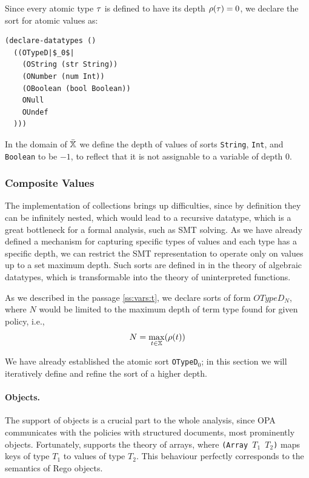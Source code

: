 Since every atomic type $\tau$ is defined to have its depth $\rho(\tau) = 0$, we declare the sort for atomic values as:
\begin{lstlisting}[language=SMT,escapechar=|]
(declare-datatypes ()
  ((OTypeD|$_0$|
    (OString (str String))
    (ONumber (num Int))
    (OBoolean (bool Boolean))
    ONull
    OUndef
  )))
\end{lstlisting}

In the domain of $\bar{\mathbb{X}}$ we define the depth of values of sorts \texttt{String}, \texttt{Int}, and \texttt{Boolean} to be $-1$, to reflect that it is not assignable to a variable of depth $0$.

\subsubsection{Composite Values}

The implementation of collections brings up difficulties, since by definition they can be infinitely nested, which would lead to a recursive datatype, which is a great bottleneck for a formal analysis, such as SMT solving.
As we have already defined a mechanism for capturing specific types of values and each type has a specific depth, we can restrict the SMT representation to operate only on values up to a set maximum depth.
Such sorts are defined in \smtlib in the theory of algebraic datatypes, which is transformable into the theory of uninterpreted functions.

As we described in the passage \ref{ss:vars:t}, we declare sorts of form \texttt{$OTypeD_N$}, where $N$ would be limited to the maximum depth of term type found for given policy, i.e.,
$$ N = \max_{t \in \mathbb{X}}(\rho(t)) $$

We have already established the atomic sort \texttt{OTypeD$_0$}; in this section we will iteratively define and refine the sort of a higher depth.

\paragraph{Objects.}
The support of objects is a crucial part to the whole analysis, since OPA communicates with the policies with structured documents, most prominently objects.
Fortunately, \smtlib supports the theory of arrays, where \texttt{(Array $T_1$ $T_2$)} maps keys of type $T_1$ to values of type $T_2$.
This behaviour perfectly corresponds to the semantics of Rego objects.


